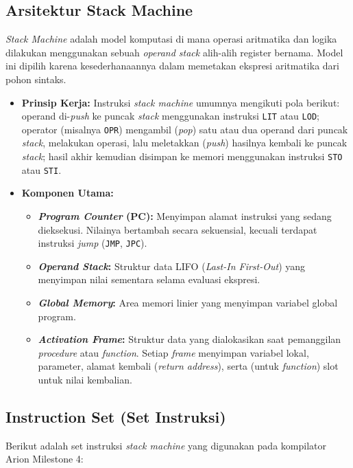 \documentclass[12pt, a4paper]{article}
\begin{document}
\subsection{Arsitektur Stack Machine}
\textit{Stack Machine} adalah model komputasi di mana operasi aritmatika dan logika dilakukan menggunakan sebuah \textit{operand stack} alih-alih register bernama. Model ini dipilih karena kesederhanaannya dalam memetakan ekspresi aritmatika dari pohon sintaks.

\begin{itemize}
    \item \textbf{Prinsip Kerja:} Instruksi \textit{stack machine} umumnya mengikuti pola berikut: operand di-\textit{push} ke puncak \textit{stack} menggunakan instruksi \texttt{LIT} atau \texttt{LOD}; operator (misalnya \texttt{OPR}) mengambil (\textit{pop}) satu atau dua operand dari puncak \textit{stack}, melakukan operasi, lalu meletakkan (\textit{push}) hasilnya kembali ke puncak \textit{stack}; hasil akhir kemudian disimpan ke memori menggunakan instruksi \texttt{STO} atau \texttt{STI}.
    \item \textbf{Komponen Utama:}
    \begin{itemize}
        \item \textbf{\textit{Program Counter} (PC):} Menyimpan alamat instruksi yang sedang dieksekusi. Nilainya bertambah secara sekuensial, kecuali terdapat instruksi \textit{jump} (\texttt{JMP}, \texttt{JPC}).
        \item \textbf{\textit{Operand Stack}:} Struktur data LIFO (\textit{Last-In First-Out}) yang menyimpan nilai sementara selama evaluasi ekspresi.
        \item \textbf{\textit{Global Memory}:} Area memori linier yang menyimpan variabel global program.
        \item \textbf{\textit{Activation Frame}:} Struktur data yang dialokasikan saat pemanggilan \textit{procedure} atau \textit{function}. Setiap \textit{frame} menyimpan variabel lokal, parameter, alamat kembali (\textit{return address}), serta (untuk \textit{function}) slot untuk nilai kembalian.
    \end{itemize}
\end{itemize}

\subsection{Instruction Set (Set Instruksi)}
Berikut adalah set instruksi \textit{stack machine} yang digunakan pada kompilator Arion Milestone 4:
\end{document}
